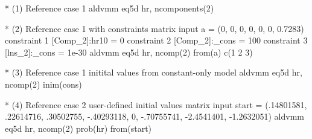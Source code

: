 \documentclass[
]{article}
\newenvironment{Shaded}{\begin{snugshade}}{\end{snugshade}}
\newcommand{\DecValTok}[1]{\textcolor[rgb]{0.00,0.00,0.81}{#1}}
\newcommand{\FloatTok}[1]{\textcolor[rgb]{0.00,0.00,0.81}{#1}}
\newcommand{\FunctionTok}[1]{\textcolor[rgb]{0.00,0.00,0.00}{#1}}
\newcommand{\NormalTok}[1]{#1}
\newcommand{\OtherTok}[1]{\textcolor[rgb]{0.56,0.35,0.01}{#1}}
\newcommand{\SpecialCharTok}[1]{\textcolor[rgb]{0.00,0.00,0.00}{#1}}
\begin{document}
\begin{Shaded}
\begin{Highlighting}[]
\SpecialCharTok{*}\NormalTok{ (}\DecValTok{1}\NormalTok{) Reference case }\DecValTok{1}
\NormalTok{aldvmm eq5d hr, }\FunctionTok{ncomponents}\NormalTok{(}\DecValTok{2}\NormalTok{)}

\SpecialCharTok{*}\NormalTok{ (}\DecValTok{2}\NormalTok{) Reference case }\DecValTok{1}\NormalTok{ with constraints}
\NormalTok{matrix  input a }\OtherTok{=}\NormalTok{ (}\DecValTok{0}\NormalTok{, }\DecValTok{0}\NormalTok{, }\DecValTok{0}\NormalTok{, }\DecValTok{0}\NormalTok{, }\DecValTok{0}\NormalTok{, }\DecValTok{0}\NormalTok{, }\FloatTok{0.7283}\NormalTok{)}
\NormalTok{constraint }\DecValTok{1}\NormalTok{ [Comp\_2]}\SpecialCharTok{:}\NormalTok{hr10 }\OtherTok{=} \DecValTok{0}
\NormalTok{constraint }\DecValTok{2}\NormalTok{ [Comp\_2]}\SpecialCharTok{:}\NormalTok{\_cons }\OtherTok{=} \DecValTok{100}
\NormalTok{constraint }\DecValTok{3}\NormalTok{ [lns\_2]}\SpecialCharTok{:}\NormalTok{\_cons }\OtherTok{=} \FloatTok{1e{-}30}
\NormalTok{aldvmm eq5d hr, }\FunctionTok{ncomp}\NormalTok{(}\DecValTok{2}\NormalTok{) }\FunctionTok{from}\NormalTok{(a) }\FunctionTok{c}\NormalTok{(}\DecValTok{1} \DecValTok{2} \DecValTok{3}\NormalTok{)}

\SpecialCharTok{*}\NormalTok{ (}\DecValTok{3}\NormalTok{) Reference case }\DecValTok{1}\NormalTok{ initital values from constant}\SpecialCharTok{{-}}\NormalTok{only model}
\NormalTok{aldvmm eq5d hr, }\FunctionTok{ncomp}\NormalTok{(}\DecValTok{2}\NormalTok{) }\FunctionTok{inim}\NormalTok{(cons)}

\SpecialCharTok{*}\NormalTok{ (}\DecValTok{4}\NormalTok{) Reference case }\DecValTok{2}\NormalTok{ user}\SpecialCharTok{{-}}\NormalTok{defined initial values}
\NormalTok{matrix  input start }\OtherTok{=}\NormalTok{ (.}\DecValTok{14801581}\NormalTok{, .}\DecValTok{22614716}\NormalTok{, .}\DecValTok{30502755}\NormalTok{, }\SpecialCharTok{{-}}\NormalTok{.}\DecValTok{40293118}\NormalTok{, }\DecValTok{0}\NormalTok{, }\SpecialCharTok{{-}}\NormalTok{.}\DecValTok{70755741}\NormalTok{, }\SpecialCharTok{{-}}\FloatTok{2.4541401}\NormalTok{, }\SpecialCharTok{{-}}\FloatTok{1.2632051}\NormalTok{)}
\NormalTok{aldvmm eq5d hr, }\FunctionTok{ncomp}\NormalTok{(}\DecValTok{2}\NormalTok{) }\FunctionTok{prob}\NormalTok{(hr) }\FunctionTok{from}\NormalTok{(start)}
\end{Highlighting}
\end{Shaded}
\end{document}
